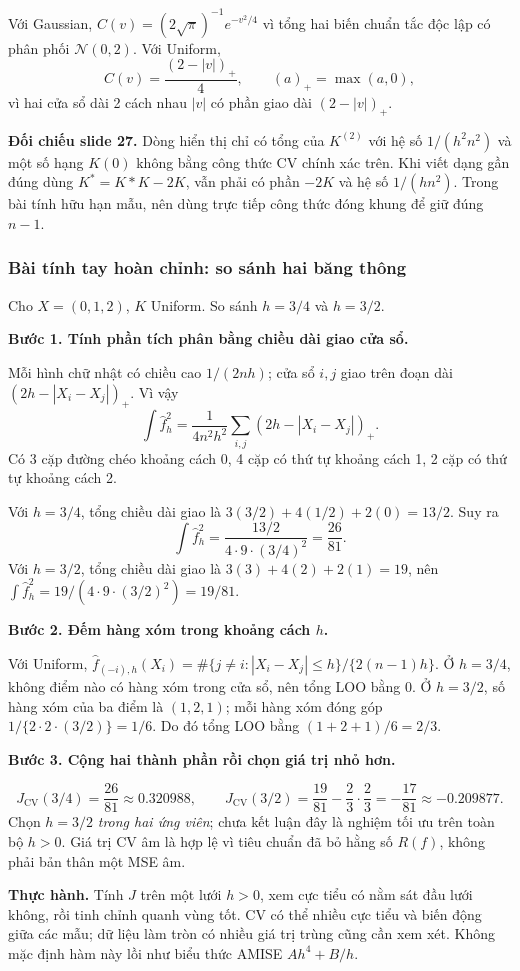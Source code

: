 \documentclass[11pt,a4paper]{article}
\newcommand{\fh}{\widehat f_h}
\newcommand{\buoc}[1]{\par\medskip\textbf{#1}\par}
\begin{document}
Với Gaussian, $C(v)=(2\sqrt\pi)^{-1}e^{-v^2/4}$ vì tổng hai biến chuẩn tắc độc lập có phân phối $\mathcal N(0,2)$. Với Uniform,
\[
C(v)=\frac{(2-|v|)_+}{4},\qquad (a)_+=\max(a,0),
\]
vì hai cửa sổ dài 2 cách nhau $|v|$ có phần giao dài $(2-|v|)_+$.

\textbf{Đối chiếu slide 27.} Dòng hiển thị chỉ có tổng của $K^{(2)}$ với hệ số $1/(h^2n^2)$ và một số hạng $K(0)$ không bằng công thức CV chính xác trên. Khi viết dạng gần đúng dùng $K^*=K*K-2K$, vẫn phải có phần $-2K$ và hệ số $1/(hn^2)$. Trong bài tính hữu hạn mẫu, nên dùng trực tiếp công thức đóng khung để giữ đúng $n-1$.

\subsubsection*{Bài tính tay hoàn chỉnh: so sánh hai băng thông}
Cho $X=(0,1,2)$, $K$ Uniform. So sánh $h=3/4$ và $h=3/2$.
\buoc{Bước 1. Tính phần tích phân bằng chiều dài giao cửa sổ.}
Mỗi hình chữ nhật có chiều cao $1/(2nh)$; cửa sổ $i,j$ giao trên đoạn dài $(2h-|X_i-X_j|)_+$. Vì vậy
\[
\int\fh^2=\frac1{4n^2h^2}\sum_{i,j}(2h-|X_i-X_j|)_+.
\]
Có 3 cặp đường chéo khoảng cách 0, 4 cặp có thứ tự khoảng cách 1, 2 cặp có thứ tự khoảng cách 2.

Với $h=3/4$, tổng chiều dài giao là $3(3/2)+4(1/2)+2(0)=13/2$. Suy ra
\[
\int\fh^2=\frac{13/2}{4\cdot9\cdot(3/4)^2}=\frac{26}{81}.
\]
Với $h=3/2$, tổng chiều dài giao là $3(3)+4(2)+2(1)=19$, nên
$\int\fh^2=19/(4\cdot9\cdot(3/2)^2)=19/81$.

\buoc{Bước 2. Đếm hàng xóm trong khoảng cách $h$.}
Với Uniform, $\widehat f_{(-i),h}(X_i)=\#\{j\ne i:|X_i-X_j|\leq h\}/\{2(n-1)h\}$.
Ở $h=3/4$, không điểm nào có hàng xóm trong cửa sổ, nên tổng LOO bằng 0.
Ở $h=3/2$, số hàng xóm của ba điểm là $(1,2,1)$; mỗi hàng xóm đóng góp $1/\{2\cdot2\cdot(3/2)\}=1/6$. Do đó tổng LOO bằng $(1+2+1)/6=2/3$.

\buoc{Bước 3. Cộng hai thành phần rồi chọn giá trị nhỏ hơn.}
\[
J_{\mathrm{CV}}(3/4)=\frac{26}{81}\approx0.320988,\qquad
J_{\mathrm{CV}}(3/2)=\frac{19}{81}-\frac23\cdot\frac23
=\boxed{-\frac{17}{81}\approx-0.209877}.
\]
Chọn $h=3/2$ \emph{trong hai ứng viên}; chưa kết luận đây là nghiệm tối ưu trên toàn bộ $h>0$. Giá trị CV âm là hợp lệ vì tiêu chuẩn đã bỏ hằng số $R(f)$, không phải bản thân một MSE âm.

\textbf{Thực hành.} Tính $J$ trên một lưới $h>0$, xem cực tiểu có nằm sát đầu lưới không, rồi tinh chỉnh quanh vùng tốt. CV có thể nhiều cực tiểu và biến động giữa các mẫu; dữ liệu làm tròn có nhiều giá trị trùng cũng cần xem xét. Không mặc định hàm này lồi như biểu thức AMISE $Ah^4+B/h$.
\end{document}

